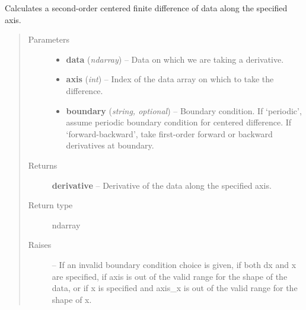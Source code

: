 \documentclass[letterpaper,10pt,english]{sphinxmanual}
\begin{document}

\begin{fulllineitems}
\label{atmos:atmos.util.d_x}
Calculates a second-order centered finite difference of data along the
specified axis.
\begin{quote}\begin{description}
\item[{Parameters}] \leavevmode\begin{itemize}
\item {} 
\textbf{data} (\emph{ndarray}) -- Data on which we are taking a derivative.

\item {} 
\textbf{axis} (\emph{int}) -- Index of the data array on which to take the difference.

\item {} 
\textbf{boundary} (\emph{string, optional}) -- Boundary condition. If `periodic', assume periodic boundary condition
for centered difference. If `forward-backward', take first-order
forward or backward derivatives at boundary.

\end{itemize}

\item[{Returns}] \leavevmode
\textbf{derivative} --
Derivative of the data along the specified axis.

\item[{Return type}] \leavevmode
ndarray

\item[{Raises}] \leavevmode
{} --
If an invalid boundary condition choice is given, if both dx and x are
specified, if axis is out of the valid range for the shape of the data,
or if x is specified and axis\_x is out of the valid range for the shape
of x.

\end{description}\end{quote}

\end{fulllineitems}

\end{document}
